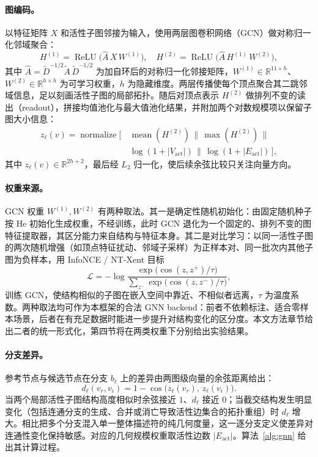 \documentclass[twocolumn, a4paper, 10pt]{article}
\begin{document}
\paragraph{图编码。}以特征矩阵 $X$ 和活性子图邻接为输入，使用两层图卷积网络（GCN）做对称归一化邻域聚合：
\begin{equation}
H^{(1)}=\operatorname{ReLU}\bigl(\hat{A}\,X\,W^{(1)}\bigr),\quad
H^{(2)}=\operatorname{ReLU}\bigl(\hat{A}\,H^{(1)}\,W^{(2)}\bigr),
\label{eq:gcn}
\end{equation}
其中 $\hat{A}=\tilde{D}^{-1/2}\tilde{A}\,\tilde{D}^{-1/2}$ 为加自环后的对称归一化邻接矩阵，$W^{(1)}\in\mathbb{R}^{11\times h}$、$W^{(2)}\in\mathbb{R}^{h\times h}$ 为可学习权重，$h$ 为隐藏维度。两层传播使每个顶点聚合其二跳邻域信息，足以刻画活性子图的局部拓扑。随后对顶点表示 $H^{(2)}$ 做排列不变的读出（readout），拼接均值池化与最大值池化结果，并附加两个对数规模项以保留子图大小信息：
\begin{equation}
\begin{aligned}
z_\ell(v)=\operatorname{normalize}\bigl[\,&\operatorname{mean}(H^{(2)})\,\big\|\,\operatorname{max}(H^{(2)})\,\big\|\\[-2pt]
&\log(1{+}|V_{\mathrm{act}}|)\,\big\|\,\log(1{+}|E_{\mathrm{act}}|)\,\bigr],
\end{aligned}
\label{eq:readout}
\end{equation}
其中 $z_\ell(v)\in\mathbb{R}^{2h+2}$，最后经 $L_2$ 归一化，使后续余弦比较只关注向量方向。

\paragraph{权重来源。}GCN 权重 $W^{(1)},W^{(2)}$ 有两种取法。其一是确定性随机初始化：由固定随机种子按 He 初始化生成权重，不经训练，此时 GCN 退化为一个固定的、排列不变的图特征提取器，其区分能力来自结构与特征本身。其二是对比学习：以同一活性子图的两次随机增强（如顶点特征扰动、邻域子采样）为正样本对、同一批次内其他子图为负样本，用 InfoNCE / NT-Xent 目标
\begin{equation}
\mathcal{L}=-\log\frac{\exp\bigl(\cos(z,z^{+})/\tau\bigr)}{\sum_{z^{-}}\exp\bigl(\cos(z,z^{-})/\tau\bigr)},
\end{equation}
训练 GCN，使结构相似的子图在嵌入空间中靠近、不相似者远离，$\tau$ 为温度系数。两种取法均可作为本框架的合法 GNN backend：前者不依赖标注、适合零样本场景，后者在有充足数据时能进一步提升对结构变化的区分度。本文方法章节给出二者的统一形式化，第四节将在两类权重下分别给出实验结果。

\paragraph{分支差异。}参考节点与候选节点在分支 $b_\ell$ 上的差异由两图级向量的余弦距离给出：
\begin{equation}
d_\ell(v_r,v_i)=1-\cos\bigl(z_\ell(v_r),\,z_\ell(v_i)\bigr).
\end{equation}
当两个局部活性子图结构高度相似时余弦接近 $1$、$d_\ell$ 接近 $0$；当截交结构发生明显变化（包括连通分支的生成、合并或消亡导致活性边集合的拓扑重组）时 $d_\ell$ 增大。相比把多个分支混入单一整体描述符的纯几何度量，这一逐分支定义使差异对连通性变化保持敏感。对应的几何规模权重取活性边数 $|E_{\mathrm{act}}|$。算法~\ref{alg:gnn} 给出其计算过程。
\end{document}
